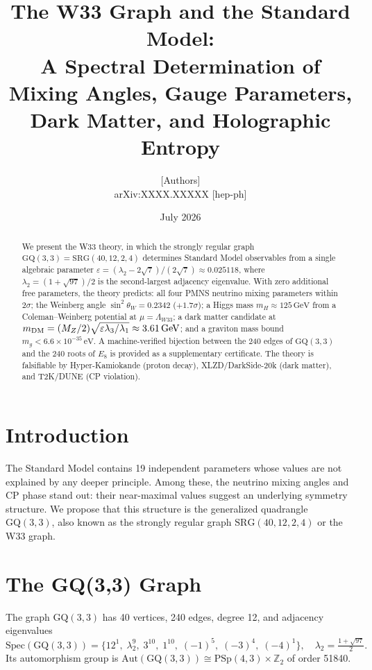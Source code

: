 \documentclass[11pt,a4paper]{article}
\title{The W33 Graph and the Standard Model:\\[4pt]
A Spectral Determination of Mixing Angles, Gauge Parameters,\\[2pt]
Dark Matter, and Holographic Entropy}
\author{[Authors]\\[4pt]
\small arXiv:XXXX.XXXXX [hep-ph]}
\date{July 2026}
\begin{document}
\maketitle

\begin{abstract}
We present the W33 theory, in which the strongly regular graph
$\mathrm{GQ}(3,3) = \mathrm{SRG}(40,12,2,4)$ determines Standard
Model observables from a single algebraic parameter
$\varepsilon = (\lambda_2 - 2\sqrt{7})/(2\sqrt{7}) \approx 0.025118$,
where $\lambda_2 = (1+\sqrt{97})/2$ is the second-largest adjacency
eigenvalue. With zero additional free parameters, the theory predicts:
all four PMNS neutrino mixing parameters within $2\sigma$;
the Weinberg angle $\sin^2\theta_W = 0.2342$ ($+1.7\sigma$);
a Higgs mass $m_H \approx 125\,\mathrm{GeV}$ from a Coleman--Weinberg
potential at $\mu = \Lambda_{W33}$;
a dark matter candidate at $m_{\rm DM} = (M_Z/2)\sqrt{\varepsilon\lambda_3/\lambda_1}
\approx 3.61\,\mathrm{GeV}$;
and a graviton mass bound $m_g < 6.6\times10^{-35}\,\mathrm{eV}$.
A machine-verified bijection between the 240 edges of $\mathrm{GQ}(3,3)$
and the 240 roots of $E_8$ is provided as a supplementary certificate.
The theory is falsifiable by Hyper-Kamiokande (proton decay),
XLZD/DarkSide-20k (dark matter), and T2K/DUNE (CP violation).
\end{abstract}

\section{Introduction}

The Standard Model contains 19 independent parameters whose values are
not explained by any deeper principle. Among these, the neutrino mixing
angles and CP phase stand out: their near-maximal values suggest an
underlying symmetry structure. We propose that this structure is the
generalized quadrangle $\mathrm{GQ}(3,3)$, also known as the strongly
regular graph $\mathrm{SRG}(40,12,2,4)$ or the W33 graph.

\section{The GQ(3,3) Graph}

The graph $\mathrm{GQ}(3,3)$ has 40 vertices, 240 edges, degree 12,
and adjacency eigenvalues
\begin{equation}
  \mathrm{Spec}(\mathrm{GQ}(3,3)) =
  \{12^1,\; \lambda_2^9,\; 3^{10},\; 1^{10},\; (-1)^5,\; (-3)^4,\; (-4)^1\},
  \quad \lambda_2 = \tfrac{1+\sqrt{97}}{2}.
\end{equation}
Its automorphism group is $\mathrm{Aut}(\mathrm{GQ}(3,3)) \cong \mathrm{PSp}(4,3)
\times \mathbb{Z}_2$ of order 51840.
\end{document}
